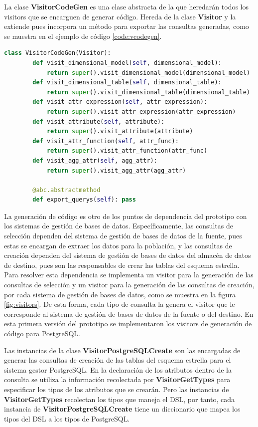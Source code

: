 La clase \textbf{VisitorCodeGen} es una clase abstracta de la que heredar\'an todos los visitors que 
se encarguen de generar código. Hereda de la clase \textbf{Visitor} y la extiende pues incorpora un 
método para exportar las consultas generadas, como se muestra en el ejemplo de c\'odigo \ref{code:vcodegen}.

\begin{lstlisting}[label={code:vcodegen}, caption={Clase VisitorCodeGen}, language={python}]
    class VisitorCodeGen(Visitor):
        def visit_dimensional_model(self, dimensional_model):
            return super().visit_dimensional_model(dimensional_model)
        def visit_dimensional_table(self, dimensional_table):
            return super().visit_dimensional_table(dimensional_table)
        def visit_attr_expression(self, attr_expression):
            return super().visit_attr_expression(attr_expression)
        def visit_attribute(self, attribute):
            return super().visit_attribute(attribute)
        def visit_attr_function(self, attr_func):
            return super().visit_attr_function(attr_func)
        def visit_agg_attr(self, agg_attr):
            return super().visit_agg_attr(agg_attr)

        @abc.abstractmethod
        def export_querys(self): pass
\end{lstlisting}

La generación de código es otro de los puntos de dependencia del prototipo con los sistemas de gestión 
de bases de datos. Específicamente, las consultas de selección dependen del sistema de gestión de bases 
de datos de la fuente, pues estas se encargan de extraer los datos para la población, y las consultas 
de creación dependen del sistema de gestión de bases de datos del almacén de datos de destino, pues 
son las responsables de crear las tablas del esquema estrella. Para resolver esta dependencia 
se implementa un visitor para la generación de las consultas de selección y un visitor para la generación 
de las consultas de creación, por cada sistema de gestión de bases de datos, como se muestra en la 
figura \ref{fig:visitors}. De esta forma, cada tipo de consulta la genera el visitor que le corresponde 
al sistema de gestión de bases de datos de la fuente o del destino. En esta primera versión del prototipo 
se implementaron los visitors de generación de código para PostgreSQL.

Las instancias de la clase \textbf{VisitorPostgreSQLCreate} son las encargadas de generar las 
consultas de creación de las tablas del esquema estrella para el sistema gestor PostgreSQL. En la 
declaración de los atributos 
dentro de la consulta se utiliza la información recolectada por \textbf{VisitorGetTypes} para 
especificar los tipos de los atributos que se crear\'an. Pero las instancias de \textbf{VisitorGetTypes} 
recolectan los tipos que maneja el DSL, por tanto, cada instancia de \textbf{VisitorPostgreSQLCreate} 
tiene un diccionario que mapea los tipos del DSL a los tipos de PostgreSQL.

